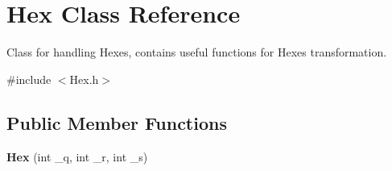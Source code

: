\hypertarget{classHex}{}\section{Hex Class Reference}
\label{classHex}


Class for handling Hexes, contains useful functions for Hexes transformation.  




{\ttfamily \#include $<$Hex.\+h$>$}

\subsection*{Public Member Functions}
\begin{DoxyCompactItemize}
\item 
{\bfseries Hex} (int \+\_\+q, int \+\_\+r, int \+\_\+s)\hypertarget{classHex_a80912c749ac053d8c8dfe048153a082f}{}\label{classHex_a80912c749ac053d8c8dfe048153a082f}


\end{DoxyCompactItemize}
